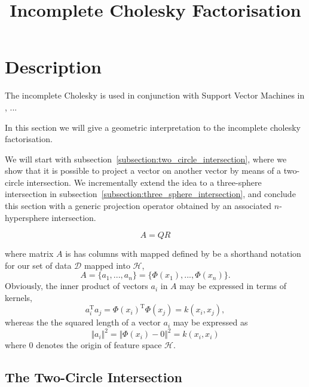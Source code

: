 \documentclass{article}
\newcommand{\x}{x}
\newcommand{\nonsv}{A}
\newcommand{\nonsve}{a}
\newcommand{\origin}{0}
\begin{document}
\title{Incomplete Cholesky Factorisation}
\maketitle

\tableofcontents

\section*{Description}

The incomplete Cholesky is used in conjunction with 
Support Vector Machines in \cite{fine01efficient}, ...


In this section we will give a geometric interpretation to 
the incomplete cholesky factorisation.

We will start with subsection~\ref{subsection:two_circle_intersection},
where we show that it is possible to project a vector on another vector
by means of a two-circle intersection. We incrementally extend the
idea to a three-sphere intersection in subsection~\ref{subsection:three_sphere_intersection},
and conclude this section with a generic projection operator
obtained by an associated $n$-hypersphere intersection.

$$A=QR$$

where matrix $\nonsv$ is has columns with mapped defined by be a
shorthand notation for our set of data $\mathcal{D}$ mapped into
$\mathcal{H}$,%
%
\begin{equation}
\nonsv=\{\nonsve_{1},...,\nonsve_{n}\}=\{\Phi(\x_{1}),...,\Phi(\x_{n})\}.
\label{equation:set_to_origin}
\end{equation}
%
Obviously, the inner product of vectors $\nonsve_{i}$ in $\nonsv$
may be expressed in terms of kernels,
%
\begin{equation}
\nonsve_{i}^{\mathrm{T}}\nonsve_{j}=\Phi(\x_{i})^{\mathrm{T}}\Phi(\x_{j})=k(\x_{i},\x_{j}),
\label{equation:inner_product_V}
\end{equation}%
%
whereas the the squared length of a vector $\nonsve_{i}$ may be expressed
as
%
$$\Vert\nonsve_{i}\Vert^{2}=\Vert\Phi(\x_{i})-\origin\Vert^{2}=k(\x_{i},\x_{i})$$
%
where $\origin$ denotes the origin of feature space $\mathcal{H}$.


\subsection{The Two-Circle Intersection\label{subsection:two_circle_intersection}}
\end{document}
